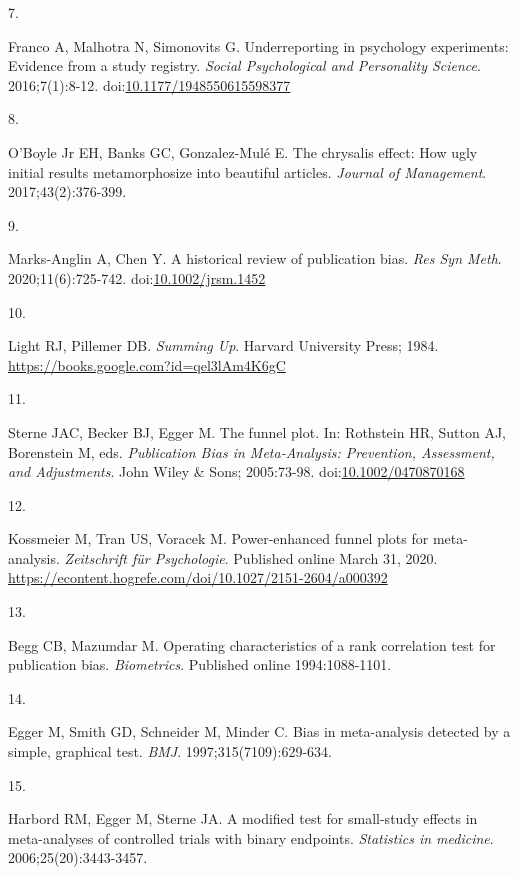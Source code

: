 \documentclass[
  man, donotrepeattitle,floatsintext]{apa7}
\newlength{\cslhangindent}
\newlength{\csllabelwidth}
\newenvironment{CSLReferences}[2] %
 {\begin{list}{}{%
  \setlength{\itemindent}{0pt}
  \setlength{\leftmargin}{0pt}
  \setlength{\parsep}{0pt}
  \ifodd #1
   \setlength{\leftmargin}{\cslhangindent}
   \setlength{\itemindent}{-1\cslhangindent}
  \fi
  \setlength{\itemsep}{#2\baselineskip}}}
 {\end{list}}
\newcommand{\CSLLeftMargin}[1]{\parbox[t]{\csllabelwidth}{\strut#1\strut}}
\newcommand{\CSLRightInline}[1]{\parbox[t]{\linewidth - \csllabelwidth}{\strut#1\strut}}
\begin{document}
\begin{CSLReferences}{0}{1}
\CSLLeftMargin{7. }%
\CSLRightInline{Franco A, Malhotra N, Simonovits G. Underreporting in psychology experiments: Evidence from a study registry. \emph{Social Psychological and Personality Science}. 2016;7(1):8-12. doi:\href{https://doi.org/10.1177/1948550615598377}{10.1177/1948550615598377}}

\CSLLeftMargin{8. }%
\CSLRightInline{O'Boyle Jr EH, Banks GC, Gonzalez-Mulé E. The chrysalis effect: How ugly initial results metamorphosize into beautiful articles. \emph{Journal of Management}. 2017;43(2):376-399.}

\CSLLeftMargin{9. }%
\CSLRightInline{Marks‐Anglin A, Chen Y. A historical review of publication bias. \emph{Res Syn Meth}. 2020;11(6):725-742. doi:\href{https://doi.org/10.1002/jrsm.1452}{10.1002/jrsm.1452}}

\CSLLeftMargin{10. }%
\CSLRightInline{Light RJ, Pillemer DB. \emph{Summing {Up}}. {Harvard University Press}; 1984. \url{https://books.google.com?id=qel3lAm4K6gC}}

\CSLLeftMargin{11. }%
\CSLRightInline{Sterne JAC, Becker BJ, Egger M. The funnel plot. In: Rothstein HR, Sutton AJ, Borenstein M, eds. \emph{Publication {Bias} in {Meta-Analysis}: {Prevention}, {Assessment}, and {Adjustments}}. {John Wiley \& Sons}; 2005:73-98. doi:\href{https://doi.org/10.1002/0470870168}{10.1002/0470870168}}

\CSLLeftMargin{12. }%
\CSLRightInline{Kossmeier M, Tran US, Voracek M. Power-enhanced funnel plots for meta-analysis. \emph{Zeitschrift für Psychologie}. Published online March 31, 2020. \url{https://econtent.hogrefe.com/doi/10.1027/2151-2604/a000392}}

\CSLLeftMargin{13. }%
\CSLRightInline{Begg CB, Mazumdar M. Operating characteristics of a rank correlation test for publication bias. \emph{Biometrics}. Published online 1994:1088-1101.}

\CSLLeftMargin{14. }%
\CSLRightInline{Egger M, Smith GD, Schneider M, Minder C. Bias in meta-analysis detected by a simple, graphical test. \emph{BMJ}. 1997;315(7109):629-634.}

\CSLLeftMargin{15. }%
\CSLRightInline{Harbord RM, Egger M, Sterne JA. A modified test for small-study effects in meta-analyses of controlled trials with binary endpoints. \emph{Statistics in medicine}. 2006;25(20):3443-3457.}


\end{CSLReferences}
\end{document}
